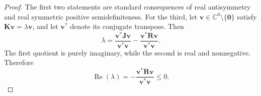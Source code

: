 \documentclass[10pt,a4paper]{amsart}
\newcommand{\Jop}{\bm J}
\newcommand{\Kop}{\bm K}
\newcommand{\Rop}{\bm R}
\begin{document}
\begin{proof}
The first two statements are standard consequences of real antisymmetry and
real symmetric positive semidefiniteness. For the third, let
$\bm v\in\mathbb C^d\setminus\{\bm0\}$ satisfy
$\Kop\bm v=\lambda\bm v$, and let $\bm v^\ast$ denote its conjugate transpose.
Then
\begin{equation}
  \lambda
  =\frac{\bm v^\ast\Jop\bm v}{\bm v^\ast\bm v}
   -\frac{\bm v^\ast\Rop\bm v}{\bm v^\ast\bm v}.
\end{equation}
The first quotient is purely imaginary, while the second is real and
nonnegative. Therefore
\begin{equation}
  \operatorname{Re}(\lambda)
  =-\frac{\bm v^\ast\Rop\bm v}{\bm v^\ast\bm v}
  \leq0.
\end{equation}
\end{proof}
\end{document}
